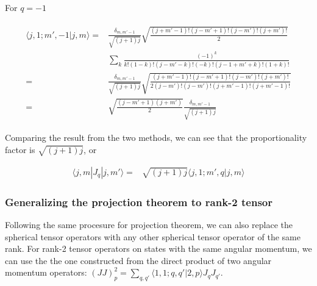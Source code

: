 \documentclass[10pt,fleqn]{article}
\newcommand{\dsum}{\displaystyle\sum}
\newcommand{\eqar}[1]
{
  \begin{align}
    #1
  \end{align}
}
\begin{document}
For $q=-1$
\eqar{
  \begin{split}
    \langle j,1;m',-1|j,m\rangle=&\frac{\delta_{m,m'-1}}{\sqrt{(j+1)j}}\sqrt{\frac{(j+m'-1)!(j-m'+1)!(j-m')!(j+m')!}{2}}\\
                                 &\sum_k\frac{(-1)^k}{k!(1-k)!(j-m'-k)!(-k)!(j-1+m'+k)!(1+k)!}\\
    =&\frac{\delta_{m,m'-1}}{\sqrt{(j+1)j}}\sqrt{\frac{(j+m'-1)!(j-m'+1)!(j-m')!(j+m')!}{2(j-m')!(j-m')!(j+m'-1)!(j+m'-1)!}}\\
    =&\sqrt{\frac{(j-m'+1)(j+m')}{2}}\frac{\delta_{m,m'-1}}{\sqrt{(j+1)j}}
  \end{split}
}
Comparing the result from the two methods,
we can see that the proportionality factor is $\sqrt{(j+1)j}$, or
\eqar{
  \langle j,m|J_q|j,m'\rangle=&\sqrt{(j+1)j}\langle j,1;m',q|j,m\rangle\label{eq:projection:spin1}
}

\subsubsection{Generalizing the projection theorem to rank-2 tensor}
Following the same procesure for projection theorem,
we can also replace the spherical tensor operators with any
other spherical tensor operator of the same rank. For rank-2 tensor operators
on states with the same angular momentum,
we can use the the one constructed from the direct product of
two angular momentum operators: $(JJ)^2_p=\dsum_{q,q'}\langle 1,1;q,q'|2,p\rangle J_q J_{q'}$.\\
\end{document}
